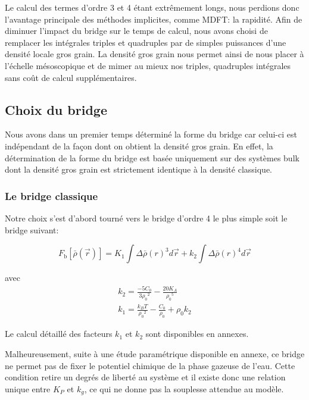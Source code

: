 Le calcul des termes d'ordre 3 et 4 étant extrêmement longs, nous perdions donc l'avantage principale des méthodes implicites, comme MDFT: la rapidité. Afin de diminuer l'impact du bridge sur le temps de calcul, nous avons choisi de remplacer les intégrales triples et quadruples par de simples puissances d'une densité locale gros grain. La densité gros grain nous permet ainsi de nous placer à l'échelle mésoscopique et de mimer au mieux nos triples, quadruples intégrales sans coût de calcul supplémentaires.


\subsection{Choix du bridge}
Nous avons dans un premier temps déterminé la forme du bridge car celui-ci est indépendant de la façon dont on obtient la densité gros grain. En effet, la détermination de la forme du bridge est basée uniquement sur des systèmes bulk dont la densité gros grain est strictement identique à la densité classique.

\subsubsection{Le bridge classique}
Notre choix s'est d'abord tourné vers le bridge d'ordre 4 le plus simple soit le bridge suivant:

\begin{equation} \label{eq:bridge_type_1}
F_{\mathrm{b}}[\bar{\rho}(\vec{r})]=K_1\int\Delta\bar{\rho}(r)^3d\vec{r}+k_2\int\Delta\bar{\rho}(r)^4d\vec{r}
\end{equation}

avec
\begin{eqnarray} \label{eq:bridge_parameter_1}
k_2 = \frac{-5C_0}{3{\rho_0}^2}-\frac{20K_A}{{\rho_0}^5} \\
k_1 = \frac{k_{B}T}{{\rho_0}^2}-\frac{C_0}{\rho_0} + \rho_0k_2
\end{eqnarray}

Le calcul détaillé des facteurs $k_1$ et $k_2$ sont disponibles en annexes.


Malheureusement, suite à une étude paramétrique disponible en annexe, ce bridge ne permet pas de fixer le potentiel chimique de la phase gazeuse de l'eau. Cette condition retire un degrés de liberté au système et il existe donc une relation unique entre $K_P$ et $k_g$, ce qui ne donne pas la souplesse attendue au modèle.


